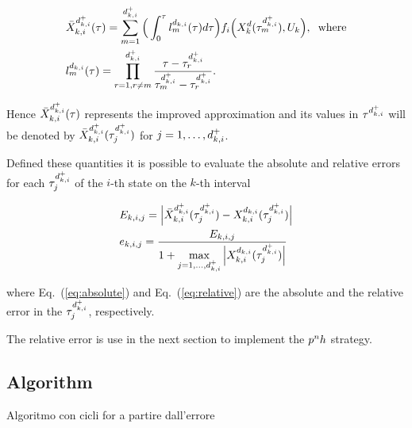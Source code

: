 \begin{subequations}
\begin{align}
	&\bar{X}_{k,i}^{d_{k,i}^{+}} (\tau) = \sum_{m=1}^{d_{k,i}^{+}}\Big(\int_{0}^{\tau}l_{m}^{d_{k,i}} (\tau)d\tau\Big) f_i\Big(X_{k}^{d}(\tau^{{d}_{k,i}^{+}}_m), U_k\Big), \hspace{2mm} \text{where} \label{eq:barX}\\
	&  l_{m}^{d_{k,i}} (\tau) = \prod_{r=1, r\neq m}^{d_{k,i}^{+}} \dfrac{\tau - \tau^{{d}_{k,i}^{+}}_r}{\tau^{{d}_{k,i}^{+}}_m - \tau^{{d}_{k,i}^{+}}_r}. \label{eq:meshlm}
\end{align}

\end{subequations}

Hence $\bar{X}_{k,i}^{d_{k,i}^{+}} (\tau)$ represents the improved approximation and its values in $\tau^{{d}_{k,i}^{+}}$ will be denoted by $\bar{X}_{k,i}^{d_{k,i}^{+}} (\tau^{{d}_{k,i}^{+}}_j)$ for $j = 1, \dots, d_{k,i}^{+}$.

Defined these quantities it is possible to evaluate the absolute and relative errors for each $\tau^{{d}_{k,i}^{+}}_j$ of the $i$-th state on the $k$-th interval

\begin{subequations}
	\begin{align}
	&E_{k,i,j} = \Big|\bar{X}_{k,i}^{d_{k,i}^{+}} (\tau^{{d}_{k,i}^{+}}_j) - X_{k,i}^{d_{k,i}} (\tau^{{d}_{k,i}^{+}}_j)\Big| \label{eq:absolute}\\
	&e_{k,i,j} = \dfrac{E_{k,i,j}}{1 + \max\limits_{j= 1, \dots, d_{k,i}^{+}} \Big| X_{k,i}^{d_{k,i}} (\tau^{{d}_{k,i}^{+}}_j)\Big|} \label{eq:relative} 
	\end{align}
\end{subequations}

where Eq.~(\ref{eq:absolute}) and Eq.~(\ref{eq:relative}) are the absolute and the relative error in the $\tau^{{d}_{k,i}^{+}}_j$, respectively.

The relative error is use in the next section to implement the $p^{n}h$ strategy.

\subsection*{Algorithm}

Algoritmo con cicli for a partire dall'errore